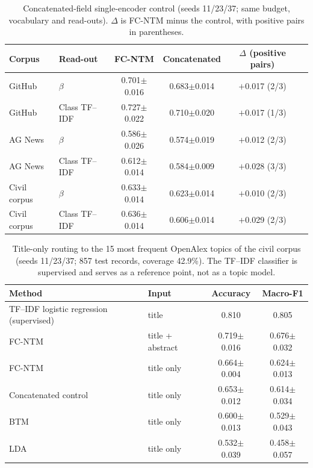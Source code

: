 \documentclass[11pt]{article}
\newcommand{\fcntm}{FC-NTM}
\begin{document}
\begin{table}[t]
\centering
\caption{Concatenated-field single-encoder control (seeds 11/23/37; same budget, vocabulary and read-outs). $\Delta$ is \fcntm{} minus the control, with positive pairs in parentheses.}
\label{tab:concat}
\small
\begin{tabular}{llcccc}
\toprule
Corpus & Read-out & \fcntm{} & Concatenated & $\Delta$ (positive pairs) \\
\midrule
GitHub & $\beta$ & 0.701$\pm$0.016 & 0.683$\pm$0.014 & $+$0.017 (2/3) \\
GitHub & Class TF--IDF & 0.727$\pm$0.022 & 0.710$\pm$0.020 & $+$0.017 (1/3) \\
AG News & $\beta$ & 0.586$\pm$0.026 & 0.574$\pm$0.019 & $+$0.012 (2/3) \\
AG News & Class TF--IDF & 0.612$\pm$0.014 & 0.584$\pm$0.009 & $+$0.028 (3/3) \\
Civil corpus & $\beta$ & 0.633$\pm$0.014 & 0.623$\pm$0.014 & $+$0.010 (2/3) \\
Civil corpus & Class TF--IDF & 0.636$\pm$0.014 & 0.606$\pm$0.014 & $+$0.029 (2/3) \\
\bottomrule
\end{tabular}
\end{table}

\begin{table}[t]
\centering
\caption{Title-only routing to the 15 most frequent OpenAlex topics of the civil corpus (seeds 11/23/37; 857 test records, coverage 42.9\%). The TF--IDF classifier is supervised and serves as a reference point, not as a topic model.}
\label{tab:archival}
\small
\begin{tabular}{llcc}
\toprule
Method & Input & Accuracy & Macro-F1 \\
\midrule
TF--IDF logistic regression (supervised) & title & 0.810 & 0.805 \\
\fcntm{} & title + abstract & 0.719$\pm$0.016 & 0.676$\pm$0.032 \\
\fcntm{} & title only & 0.664$\pm$0.004 & 0.624$\pm$0.013 \\
Concatenated control & title only & 0.653$\pm$0.012 & 0.614$\pm$0.034 \\
BTM & title only & 0.600$\pm$0.013 & 0.529$\pm$0.043 \\
LDA & title only & 0.532$\pm$0.039 & 0.458$\pm$0.057 \\
\bottomrule
\end{tabular}
\end{table}
\end{document}
